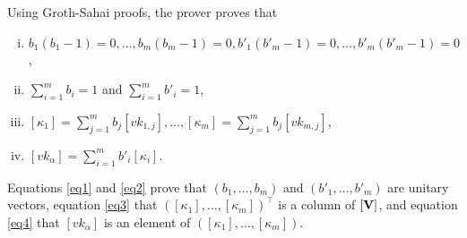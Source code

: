 Using Groth-Sahai proofs, the prover proves that
\begin{enumerate}[i.]
\item $b_1(b_1-1)=0,\ldots,b_m(b_m-1)=0,b'_1(b'_m-1)=0,\ldots,b'_m(b'_m-1)=0$,\label{eq1}
\item $\sum_{i=1}^m b_i =1$ and $\sum_{i=1}^m b'_i=1$,\label{eq2}
\item $[\kappa_1]=\sum_{j=1}^m b_j [vk_{1,j}],\ldots,[\kappa_m]=\sum_{j=1}^m b_j[vk_{m,j}]$,\label{eq3}
\item $[vk_\alpha]=\sum_{i=1}^m b'_i[\kappa_i]$.\label{eq4}
\end{enumerate}
Equations \ref{eq1} and \ref{eq2} prove that $(b_1,\ldots,b_m)$ and $(b'_1,\ldots,b'_m)$ are unitary vectors, equation \ref{eq3} that $([\kappa_1],\ldots,[\kappa_m])^\top$ is a column of $[\mathbf{{V}}]$, and equation \ref{eq4} that $[vk_\alpha]$ is an element of $([\kappa_1],\ldots,[\kappa_m])$.